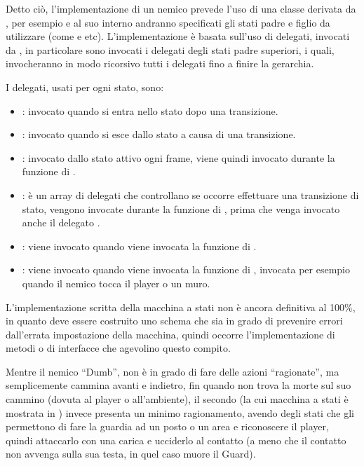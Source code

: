 Detto ciò, l'implementazione di un nemico prevede l'uso di una classe derivata da , per esempio  e al suo interno andranno specificati gli stati padre e figlio da utilizzare (come  e  etc). L'implementazione è basata sull'uso di delegati, invocati da , in particolare sono invocati i delegati degli stati padre superiori, i quali, invocheranno in modo ricorsivo tutti i delegati fino a finire la gerarchia. 

I delegati, usati per ogni stato, sono:

\begin{itemize}

\item {}: invocato quando si entra nello stato dopo una transizione.
\item {}: invocato quando si esce dallo stato a causa di una transizione.
\item {}: invocato dallo stato attivo ogni frame, viene quindi invocato durante la funzione  di .
\item {}: è un array di delegati che controllano se occorre effettuare una transizione di stato, vengono invocate durante la funzione  di , prima che venga invocato anche il delegato .
\item {}: viene invocato quando viene invocata la funzione  di .
\item {}: viene invocato quando viene invocata la funzione  di , invocata per esempio quando il nemico tocca il player o un muro.

\end{itemize}

L'implementazione scritta della macchina a stati non è ancora definitiva al 100\%, in quanto deve essere costruito uno schema che sia in grado di prevenire errori dall'errata impostazione della macchina, quindi occorre l'implementazione di metodi o di interfacce che agevolino questo compito.

Mentre il nemico ``Dumb'', non è in grado di fare delle azioni ``ragionate'', ma semplicemente cammina avanti e indietro, fin quando non trova la morte sul suo cammino (dovuta al player o all'ambiente), il secondo (la cui macchina a stati è mostrata in \myfig{\ref{fig:gerarchiaAIGuard}} ) invece presenta un minimo ragionamento, avendo degli stati che gli permettono di fare la guardia ad un posto o un area e riconoscere il player, quindi attaccarlo con una carica e ucciderlo al contatto (a meno che il contatto non avvenga sulla sua testa, in quel caso muore il Guard).

